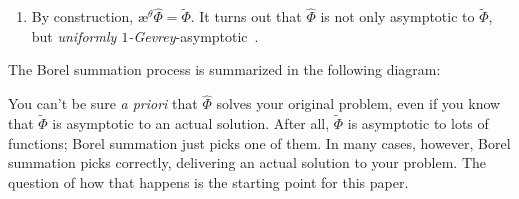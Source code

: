 \documentclass{article}
\theoremstyle{definition}
\newcommand{\series}[1]{\tilde{#1}}
\newcommand{\laplace}{\mathcal{L}}
\newcommand{\borel}{\mathcal{B}}
\newcommand{\aexp}{\text{\ae}}
\theoremstyle{plain}
\begin{document}
\begin{enumerate}[start=4]
\item By construction, $\aexp^\theta \hat{\Phi} = \series{\Phi}$. It turns out that $\hat{\Phi}$ is not only asymptotic to $\series{\Phi}$, but {\em {uniformly} $1$-Gevrey}-asymptotic~\cite[Corollary~5.23]{diverg-resurg-i}.
\end{enumerate}

The Borel summation process is summarized in the following diagram:
\begin{center}
\end{center}

You can't be sure {\em a priori} that $\hat{\Phi}$ solves your original problem, even if you know that $\series{\Phi}$ is asymptotic to an actual solution. After all, $\series{\Phi}$ is asymptotic to lots of functions; Borel summation just picks one of them. In many cases, however, Borel summation picks correctly, delivering an actual solution to your problem. The question of how that happens is the starting point for this paper.
\end{document}

